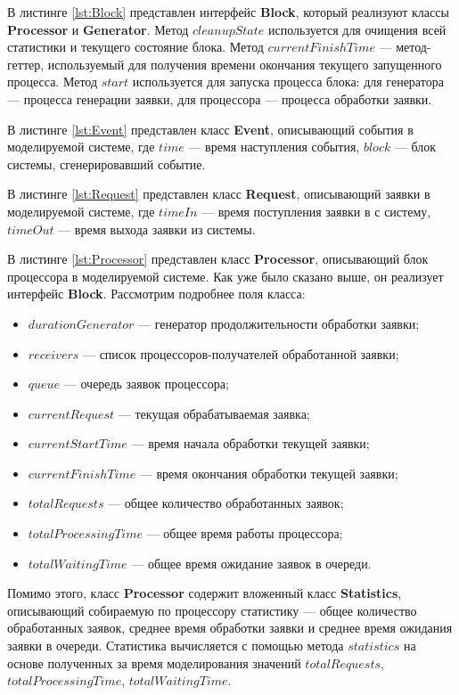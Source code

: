 \documentclass{bmstu}
\begin{document}
В листинге \ref{lst:Block} представлен интерфейс \textbf{Block}, который реализуют классы \textbf{Processor} и \textbf{Generator}. Метод $cleanupState$ используется для очищения всей статистики и текущего состояние блока. Метод $currentFinishTime$ --- метод-геттер, используемый для получения времени окончания текущего запущенного процесса. Метод $start$ используется для запуска процесса блока: для генератора --- процесса генерации заявки, для процессора --- процесса обработки заявки.


В листинге \ref{lst:Event} представлен класс \textbf{Event}, описывающий события в моделируемой системе, где $time$ --- время наступления события, $block$ --- блок системы, сгенерировавший событие.


В листинге \ref{lst:Request} представлен класс \textbf{Request}, описывающий заявки в моделируемой системе, где $timeIn$ --- время поступления заявки в с систему, $timeOut$ --- время выхода заявки из системы.


В листинге \ref{lst:Processor} представлен класс \textbf{Processor}, описывающий блок процессора в моделируемой системе. Как уже было сказано выше, он реализует интерфейс \textbf{Block}. Рассмотрим подробнее поля класса:
\begin{itemize}
	\item $durationGenerator$ --- генератор продолжительности обработки заявки;
	\item $receivers$ --- список процессоров-получателей обработанной заявки;
	\item $queue$ --- очередь заявок процессора;
	\item $currentRequest$ --- текущая обрабатываемая заявка;
	\item $currentStartTime$ --- время начала обработки текущей заявки;
	\item $currentFinishTime$ --- время окончания обработки текущей заявки;
	\item $totalRequests$ --- общее количество обработанных заявок;
	\item $totalProcessingTime$ --- общее время работы процессора;
	\item $totalWaitingTime$ --- общее время ожидание заявок в очереди.
\end{itemize}
Помимо этого, класс \textbf{Processor} содержит вложенный класс \textbf{Statistics}, описывающий собираемую по процессору статистику --- общее количество обработанных заявок, среднее время обработки заявки и среднее время ожидания заявки в очереди. Статистика вычисляется с помощью метода $statistics$ на основе полученных за время моделирования значений $totalRequests$, $totalProcessingTime$, $totalWaitingTime$.
\end{document}
